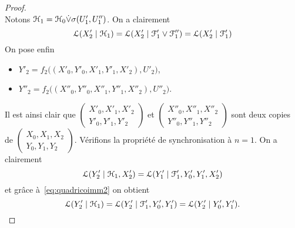 \documentclass[12pt,a4paper]{article}
\begin{document}
\begin{appendices}
\begin{proof}
$$$$
Notons $\EuScript{H}_1 = \EuScript{H}_0 \dot{\vee} \sigma(U'_1, U''_1)$. On a clairement 
\begin{equation}\label{eq:quadricoimm2}
\EuScript{L}(X'_2 \mid \EuScript{H}_1) = \EuScript{L}(X'_2 \mid \EuScript{F}'_1\vee\EuScript{F}''_1) = \EuScript{L}(X'_2 \mid \EuScript{F}'_1)
\end{equation}
On pose enfin 
\begin{itemize}
\item $Y'_2 = f_2\bigl((X'_0, Y'_0, X'_1, Y'_1, X'_2), U'_2\bigr)$,
\item $Y''_2 = f_2\bigl((X''_0, Y''_0, X''_1, Y''_1, X''_2), U''_2\bigr)$.
\end{itemize} 
Il est ainsi clair que $\left(\begin{smallmatrix}
X'_0, X'_1, X'_2 \\ Y'_0, Y'_1, Y'_2 \end{smallmatrix}\right)$ et 
$\left(\begin{smallmatrix}
X''_0, X''_1, X''_2 \\ Y''_0, Y''_1,Y''_2 \end{smallmatrix}\right)$ sont deux copies de 
$\left(\begin{smallmatrix}
X_0, X_1, X_2 \\ Y_0, Y_1, Y_2 \end{smallmatrix}\right)$. 
Vérifions la propriété de synchronisation à $n=1$. On a clairement 
$$
\EuScript{L}(Y'_2 \mid \EuScript{H}_1, X'_2) = \EuScript{L}(Y'_1 \mid \EuScript{F}'_1, Y'_0, Y'_1, X'_2) 
$$
et grâce à~\eqref{eq:quadricoimm2} on obtient 
$$
\EuScript{L}(Y'_2 \mid \EuScript{H}_1) = \EuScript{L}(Y'_2 \mid \EuScript{F}'_1, Y'_0, Y'_1) = \EuScript{L}(Y'_2 \mid Y'_0, Y'_1).  
$$
\end{proof}
\end{appendices}

\end{document}

